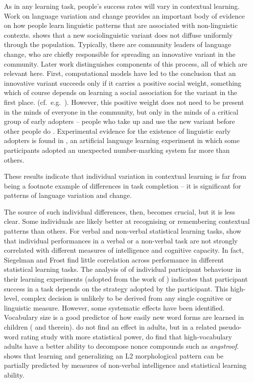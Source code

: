 \documentclass{frontiersSCNS} %
\begin{document}
As in any learning task, people's success rates will vary in contextual learning. Work on language variation and change provides an important body of evidence on how people learn linguistic patterns that are associated with non-linguistic contexts. \cite{labov2001} shows that a new sociolinguistic variant does not diffuse uniformly through the population. Typically, there are community leaders of language change, who are chiefly responsible for spreading an innovative variant in the community. Later work distinguishes  components of this process, all of which are relevant here. First, computational models have led to the conclusion that an innovative variant succeeds only if it carries a positive social weight, something which of course depends on learning a social association for the variant in the first place.
 (cf.\ e.g.\ \citealt{baxter2009modeling,fagyal2010}). However, this positive weight does not need to be present in the minds of everyone in the community, but only in the minds of a critical group of early adopters -- people who take up and use the new variant before other people do \citep{ pierrehumbert2014model}. Experimental evidence for the existence of linguistic early adopters is found in \cite{schumacher2014}, an artificial language learning experiment in which some participants adopted an unexpected number-marking system far more than others. 

 These results indicate that individual variation in contextual learning is far from being a footnote example of differences in task completion -- it is significant for patterns of language variation and change. 

The source of such individual differences, then, becomes crucial, but it is less clear. Some individuals are likely better at recognising or remembering contextual patterns than others.  For verbal and non-verbal statistical learning tasks, \cite{siegelman2015statistical} show that individual performances in a verbal or a non-verbal task are not strongly correlated with different measures of intelligence and cognitive capacity. In fact, Siegelman and Frost find little correlation across performance in different statistical learning tasks. The analysis of \cite{lleras2004spatial} of individual participant behaviour in their learning experiments (adopted from the work of \citealt{chun1998contextual}) indicates that participant success in a task depends on the strategy adopted by the participant. This high-level, complex decision is unlikely to be derived from any single cognitive or linguistic measure. However, some systematic effects have been identified. Vocabulary size is a good predictor of how easily new word forms are learned in children (\citealt{henderson51gaskell} and therein). \cite{henderson51gaskell} do not find an effect in adults, but in a related pseudo-word rating study with more statistical power, \cite{needle} do find that high-vocabulary adults have a better ability to decompose nonce compounds such as {\it angstroof}. \citet{brooks2016distributional} shows that learning and generalizing an L2 morphological pattern can be partially predicted by measures of non-verbal intelligence and statistical learning ability.{}
\end{document}
